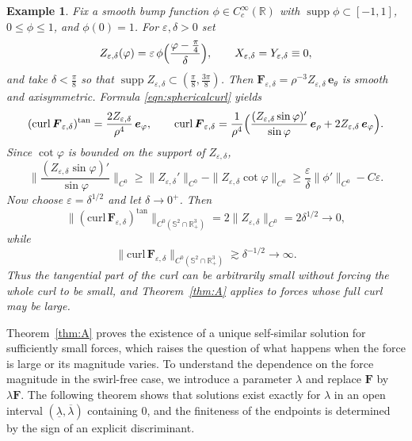 \documentclass{amsart}
\newtheorem{example}{Example}[section]
\newcommand{\curl}{\mathrm{curl}}
\newcommand{\Be}{{\boldsymbol{e}}}
\newcommand{\BF}{{\boldsymbol{F}}}
\newcommand{\R}{\mathbb{R}}
\begin{document}
\begin{example}
Fix a smooth bump function $\phi\in C^{\infty}_{c}(\R)$ with $\operatorname{supp}\phi\subset[-1,1]$,
$0\le\phi\le1$, and $\phi(0)=1$.  For $\varepsilon,\delta>0$ set
\[
Z_{\varepsilon,\delta}(\varphi)=\varepsilon\,\phi\Bigl(\frac{\varphi-\frac{\pi}{4}}{\delta}\Bigr),\qquad
X_{\varepsilon,\delta}=Y_{\varepsilon,\delta}\equiv0,
\]
and take $\delta<\frac{\pi}{8}$ so that $\operatorname{supp}Z_{\varepsilon,\delta}\subset(\frac{\pi}{8},\frac{3\pi}{8})$.
Then $\BF_{\varepsilon,\delta}= \rho^{-3}Z_{\varepsilon,\delta}\,\Be_{\theta}$ is smooth and axisymmetric.
Formula \eqref{eqn:sphericalcurl} yields
\[
(\curl\,\BF_{\varepsilon,\delta})^{\tan}= \frac{2Z_{\varepsilon,\delta}}{\rho^{4}}\,\Be_{\varphi},
\qquad
\curl\,\BF_{\varepsilon,\delta}= \frac{1}{\rho^{4}}\Bigl( \frac{(Z_{\varepsilon,\delta}\sin\varphi)'}{\sin\varphi}\,\Be_{\rho}
+ 2Z_{\varepsilon,\delta}\,\Be_{\varphi} \Bigr).
\]
Since $\cot\varphi$ is bounded on the support of $Z_{\varepsilon,\delta}$,
\[
\biggl\|\frac{(Z_{\varepsilon,\delta}\sin\varphi)'}{\sin\varphi}\biggr\|_{C^{0}}
\ge \|Z_{\varepsilon,\delta}'\|_{C^{0}} - \|Z_{\varepsilon,\delta}\cot\varphi\|_{C^{0}}
\ge \frac{\varepsilon}{\delta}\|\phi'\|_{C^{0}} - C\varepsilon.
\]
Now choose $\varepsilon=\delta^{1/2}$ and let $\delta\to0^{+}$.  Then
\[
\|(\curl\,\BF_{\varepsilon,\delta})^{\tan}\|_{C^{0}(\mathbb{S}^{2}\cap\R^{3}_{+})}
= 2\|Z_{\varepsilon,\delta}\|_{C^{0}} = 2\delta^{1/2}\to0,
\]
while
\[
\|\curl\,\BF_{\varepsilon,\delta}\|_{C^{0}(\mathbb{S}^{2}\cap\R^{3}_{+})}
\gtrsim \delta^{-1/2}\to\infty.
\]
Thus the tangential part of the curl can be arbitrarily small without forcing the whole curl to be small,
and Theorem~\ref{thm:A} applies to forces whose full curl may be large.
\end{example}


Theorem~\ref{thm:A} proves the existence of a unique self-similar solution for sufficiently small forces, which raises the question of what happens when the force is large or its magnitude varies. To understand the dependence on the force magnitude in the swirl-free case, we introduce a parameter $\lambda$ and replace $\BF$ by $\lambda\BF$.  The following theorem shows that solutions exist exactly for $\lambda$ in an open interval $(\underline{\lambda},\overline{\lambda})$ containing $0$, and the finiteness of the endpoints is determined by the sign of an explicit discriminant.
\end{document}
